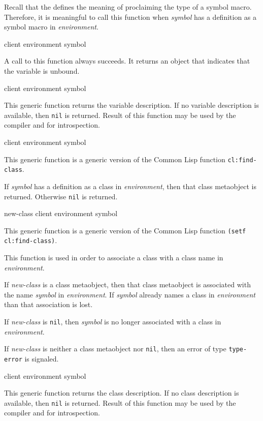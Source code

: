 Recall that the \hs{} defines the meaning of proclaiming the type of a
symbol macro.  Therefore, it is meaningful to call this function when
\textit{symbol} has a definition as a symbol macro in
\textit{environment}.

 {client environment symbol}

A call to this function always succeeds.  It returns an object that indicates
that the variable is unbound.

 {client environment symbol}

This generic function returns the variable description. If no variable
description is available, then \texttt{nil} is returned. Result of this
function may be used by the compiler and for introspection.

 {client environment symbol}

This generic function is a generic version of the Common Lisp function
\texttt{cl:find-class}.

If \textit{symbol} has a definition as a class in
\textit{environment}, then that class metaobject is returned.
Otherwise \texttt{nil} is returned.

 {new-class client environment symbol}

This generic function is a generic version of the Common Lisp function
\texttt{(setf cl:find-class)}.

This function is used in order to associate a class with a class name
in \textit{environment}.

If \textit{new-class} is a class metaobject, then that class
metaobject is associated with the name \textit{symbol} in
\textit{environment}.  If \textit{symbol} already names a class in
\textit{environment} than that association is lost.

If \textit{new-class} is \texttt{nil}, then \textit{symbol} is no
longer associated with a class in \textit{environment}.

If \textit{new-class} is neither a class metaobject nor \texttt{nil},
then an error of type \texttt{type-error} is signaled.

 {client environment symbol}

This generic function returns the class description. If no class description
is available, then \texttt{nil} is returned. Result of this function may be
used by the compiler and for introspection.


